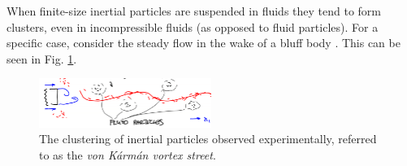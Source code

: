 \begin{ex}
	When finite-size inertial particles are suspended in fluids they tend to form clusters, even in incompressible fluids (as opposed to fluid particles). For a specific case, consider the steady flow in the wake of a bluff body \cite{Burns1999}. This can be seen in Fig. \ref{fig:vortex_street}.
\begin{figure}[h!]
	\centering
	\includegraphics[width=0.5\textwidth]{figures/ch9/20vortex_street.png}
	\caption{The clustering of inertial particles observed experimentally, referred to as the \emph{von Kármán vortex street}.}
	\label{fig:vortex_street}
\end{figure}


\end{ex}
